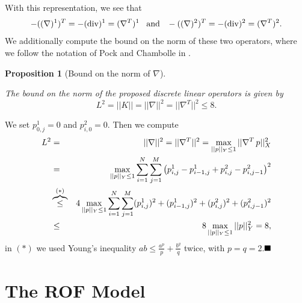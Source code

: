 \documentclass[abstracton]{scrreprt}
\newcommand{\qed}{$\hfill\blacksquare$}
\newtheorem{proposition}[theorem]{Proposition}
\newenvironment{proof}[1][Proof]{\begin{trivlist}
\item[\hskip \labelsep {\bfseries #1}]}{\end{trivlist}}
\begin{document}
        With this representation, we see that 
            $$
                -((\nabla)^{1})^{T} = -(\textnormal{div})^{1} = (\nabla^{T})^{1} \,\,\,\,\, \textnormal{and} \,\,\,\,\, -((\nabla)^{2})^{T} = -(\textnormal{div})^{2} = (\nabla^{T})^{2}.
            $$
        We additionally compute the bound on the norm of these two operators, where we follow the notation of Pock and Chambolle in \cite{Chambolle10afirst-order}.
        \begin{proposition}[Bound on the norm of $\nabla$] %
            \label{prop:bound_on_the_norm}

            The bound on the norm of the proposed discrete linear operators is given by
                $$
                    L^{2} = ||K|| = ||\nabla||^{2} = ||\nabla^{T}||^{2} \le 8.
                $$
        \end{proposition}
        \begin{proof} %
            We set $p^{1}_{0,j} = 0$ and $p^{2}_{i,0} = 0$. Then we compute
                \begin{eqnarray}
                    L^{2} &=& ||\nabla||^{2} = ||\nabla^{T}||^{2} = \max_{||p||_{Y} \le 1} ||\nabla^{T}\,p||^{2}_{X} \notag \\
                    &=& \max_{||p||_{Y} \le 1} \sum_{i = 1}^{N} \sum_{j = 1}^{M} \left( p^{1}_{i, j} - p^{1}_{i-1, j} + p^{2}_{i, j} - p^{2}_{i, j-1} \right)^{2} \notag \\
                    &\overbrace{\le}^{(\ast)}& 4 \max_{||p||_{Y} \le 1} \sum_{i = 1}^{N} \sum_{j = 1}^{M} (p^{1}_{i, j})^{2} + (p^{1}_{i-1, j})^{2} + (p^{2}_{i, j})^{2} + (p^{2}_{i, j-1})^{2} \notag \\
                    &\le& 8 \max_{||p||_{Y} \le 1} ||p||^{2}_{Y} = 8, \notag
                \end{eqnarray}
            in $(\ast)$ we used Young's inequality $ab \le \frac{a^{p}}{p} + \frac{b^{q}}{q}$ twice, with $p = q = 2$.\qed
        \end{proof}
    \section{The ROF Model} %
    \label{sec:the_rof_model}
        
\end{document}
